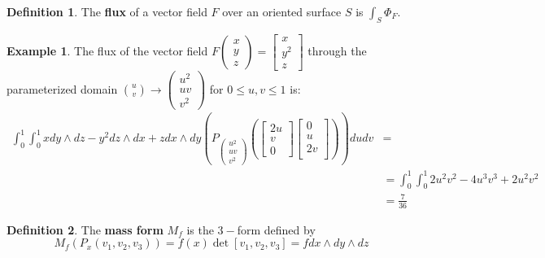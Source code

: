 \documentclass[10pt, oneside]{article}
\theoremstyle{definition}
\newtheorem{exmp}{Example}[section]
\newtheorem{defn}{Definition}
\begin{document}
\begin{defn}
    The \textbf{flux} of a vector field $F$ over an oriented surface $S$ is $\int_S \Phi_F.$
\end{defn}
\begin{exmp}
    The flux of the vector field $F\begin{pmatrix}
        x\\ y\\z
    \end{pmatrix} = \begin{bmatrix}
        x \\ y^2 \\z
    \end{bmatrix}$ through the parameterized domain $\binom{u}{v}\to \begin{pmatrix}
        u^2\\ uv \\ v^2
    \end{pmatrix}$ for $0\leq u,v\leq 1$ is:
    \begin{align*}
    \int_0^1 \int_0^1 x dy \wedge dz - y^2 dz \wedge dx + z dx \wedge dy \left(P_{\begin{pmatrix}
        u^2\\ uv \\v^2
    \end{pmatrix}}\left(\begin{bmatrix}
        2u\\ v\\ 0
    \end{bmatrix}\begin{bmatrix}
        0 \\ u \\2v\\
    \end{bmatrix}\right)\right)dudv &=\\ &=\int_0^1\int_0^1 2u^2v^2 - 4u^3v^3 + 2u^2v^2\\
    &= \frac{7}{36}
    \end{align*}
    
\end{exmp}

\begin{defn}
    The \textbf{mass form} $M_f$ is the $3-$form defined by 
    \[M_f(P_x(v_1, v_2, v_3)) = f(x)\det[v_1, v_2, v_3] = f dx \wedge dy \wedge dz\]
\end{defn}
\end{document}
